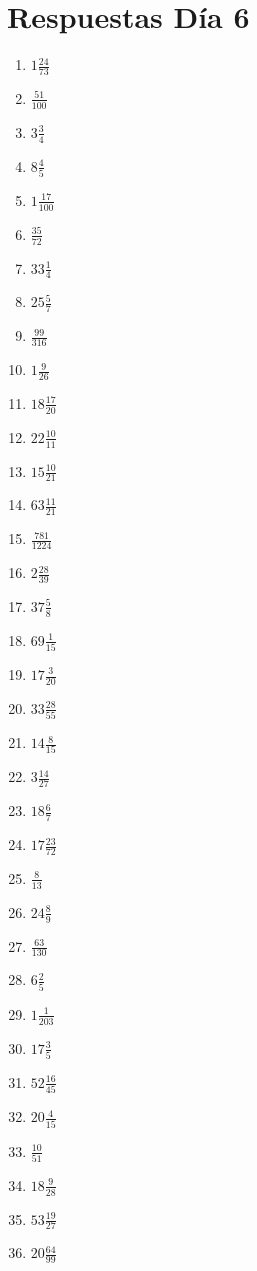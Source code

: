 \documentclass[12pt]{article}
\begin{document}
\section*{Respuestas Día 6}
\begin{enumerate}
\item $ 1 \frac{24}{73} $
\item $ \frac{51}{100} $
\item $ 3 \frac{3}{4} $
\item $ 8 \frac{4}{5} $
\item $ 1 \frac{17}{100} $
\item $ \frac{35}{72} $
\item $ 33 \frac{1}{4} $
\item $ 25 \frac{5}{7} $
\item $ \frac{99}{316} $
\item $ 1 \frac{9}{26} $
\item $ 18 \frac{17}{20} $
\item $ 22 \frac{10}{11} $
\item $ 15 \frac{10}{21} $
\item $ 63 \frac{11}{21} $
\item $ \frac{781}{1224} $
\item $ 2 \frac{28}{39} $
\item $ 37 \frac{5}{8} $
\item $ 69 \frac{1}{15} $
\item $ 17 \frac{3}{20} $
\item $ 33 \frac{28}{55} $
\item $ 14 \frac{8}{15} $
\item $ 3 \frac{14}{27} $
\item $ 18 \frac{6}{7} $
\item $ 17 \frac{23}{72} $
\item $ \frac{8}{13} $
\item $ 24 \frac{8}{9} $
\item $ \frac{63}{130} $
\item $ 6 \frac{2}{5} $
\item $ 1 \frac{1}{203} $
\item $ 17 \frac{3}{5} $
\item $ 52 \frac{16}{45} $
\item $ 20 \frac{4}{15} $
\item $ \frac{10}{51} $
\item $ 18 \frac{9}{28} $
\item $ 53 \frac{19}{27} $
\item $ 20 \frac{64}{99} $

\end{enumerate}
\end{document}
